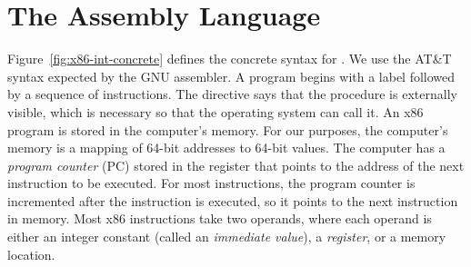 \documentclass[7x10,nocrop]{TimesAPriori_MIT}%
\begin{document}
\section{The \LangXInt{} Assembly Language}
\label{sec:x86}

Figure~\ref{fig:x86-int-concrete} defines the concrete syntax for
\LangXInt{}.  We use the AT\&T syntax expected by the GNU
assembler.
%
A program begins with a  label followed by a sequence of
instructions. The  directive says that the 
procedure is externally visible, which is necessary so that the
operating system can call it.
%
An x86 program is stored in the computer's memory.  For our purposes,
the computer's memory is a mapping of 64-bit addresses to 64-bit
values.  The computer has a \emph{program counter} (PC) stored in the  register that points to
the address of the next instruction to be executed.  For most
instructions, the program counter is incremented after the instruction
is executed, so it points to the next instruction in memory.  Most x86
instructions take two operands, where each operand is either an
integer constant (called an \emph{immediate value}), a \emph{register}, or a memory location.

\newcommand{\allregisters}{\key{rsp} \MID \key{rbp} \MID \key{rax} \MID \key{rbx} \MID \key{rcx}
              \MID \key{rdx} \MID \key{rsi} \MID \key{rdi} \MID \\
              && \key{r8} \MID \key{r9} \MID \key{r10}
              \MID \key{r11} \MID \key{r12} \MID \key{r13}
              \MID \key{r14} \MID \key{r15}}
\end{document}
